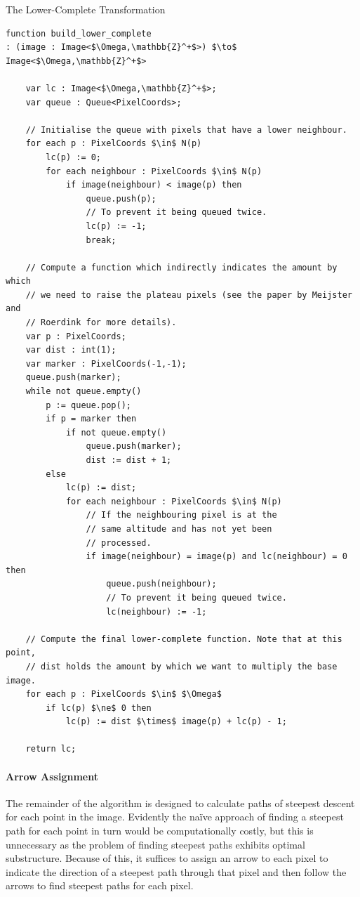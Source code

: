 \begin{stulisting}[p]
\caption{The Lower-Complete Transformation}
\label{code:segmentation-watershed-lowercomplete}
\begin{lstlisting}[style=Default]
function build_lower_complete
: (image : Image<$\Omega,\mathbb{Z}^+$>) $\to$ Image<$\Omega,\mathbb{Z}^+$>

	var lc : Image<$\Omega,\mathbb{Z}^+$>;
	var queue : Queue<PixelCoords>;

	// Initialise the queue with pixels that have a lower neighbour.
	for each p : PixelCoords $\in$ N(p)
		lc(p) := 0;
		for each neighbour : PixelCoords $\in$ N(p)
			if image(neighbour) < image(p) then
				queue.push(p);
				// To prevent it being queued twice.
				lc(p) := -1;
				break;

	// Compute a function which indirectly indicates the amount by which
	// we need to raise the plateau pixels (see the paper by Meijster and
	// Roerdink for more details).
	var p : PixelCoords;
	var dist : int(1);
	var marker : PixelCoords(-1,-1);
	queue.push(marker);
	while not queue.empty()
		p := queue.pop();
		if p = marker then
			if not queue.empty()
				queue.push(marker);
				dist := dist + 1;
		else
			lc(p) := dist;
			for each neighbour : PixelCoords $\in$ N(p)
				// If the neighbouring pixel is at the
				// same altitude and has not yet been
				// processed.
				if image(neighbour) = image(p) and lc(neighbour) = 0 then
					queue.push(neighbour);
					// To prevent it being queued twice.
					lc(neighbour) := -1;
	
	// Compute the final lower-complete function. Note that at this point,
	// dist holds the amount by which we want to multiply the base image.
	for each p : PixelCoords $\in$ $\Omega$
		if lc(p) $\ne$ 0 then
			lc(p) := dist $\times$ image(p) + lc(p) - 1;

	return lc;
\end{lstlisting}
\end{stulisting}

\paragraph{Arrow Assignment}

The remainder of the algorithm is designed to calculate paths of steepest descent for each point in the image. Evidently the na\"ive approach of finding a steepest path for each point in turn would be computationally costly, but this is unnecessary as the problem of finding steepest paths exhibits optimal substructure. Because of this, it suffices to assign an arrow to each pixel to indicate the direction of a steepest path through that pixel and then follow the arrows to find steepest paths for each pixel.

